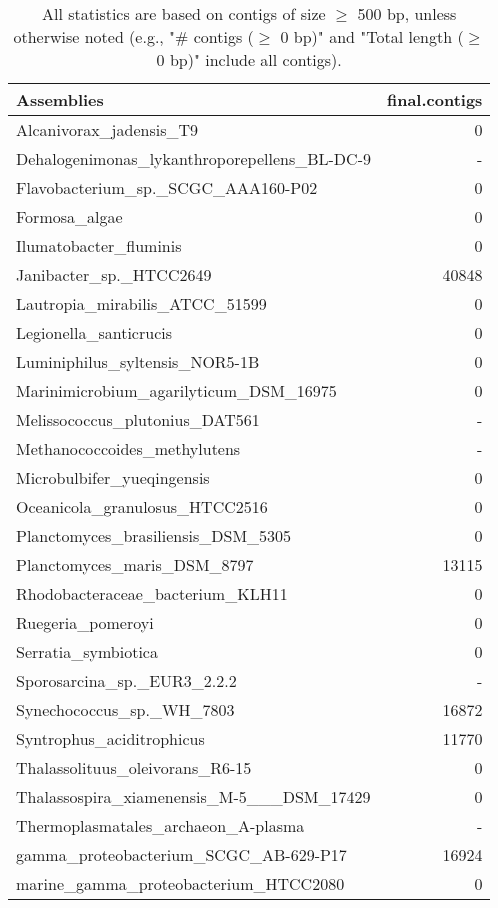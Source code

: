 \documentclass[12pt,a4paper]{article}
\begin{document}
\begin{table}[ht]
\begin{center}
\caption{All statistics are based on contigs of size $\geq$ 500 bp, unless otherwise noted (e.g., "\# contigs ($\geq$ 0 bp)" and "Total length ($\geq$ 0 bp)" include all contigs).}
\begin{tabular}{|l*{1}{|r}|}
\hline
Assemblies & final.contigs \\ \hline
Alcanivorax\_jadensis\_T9 & 0 \\ \hline
Dehalogenimonas\_lykanthroporepellens\_BL-DC-9 & - \\ \hline
Flavobacterium\_sp.\_SCGC\_AAA160-P02 & 0 \\ \hline
Formosa\_algae & 0 \\ \hline
Ilumatobacter\_fluminis & 0 \\ \hline
Janibacter\_sp.\_HTCC2649 & 40848 \\ \hline
Lautropia\_mirabilis\_ATCC\_51599 & 0 \\ \hline
Legionella\_santicrucis & 0 \\ \hline
Luminiphilus\_syltensis\_NOR5-1B & 0 \\ \hline
Marinimicrobium\_agarilyticum\_DSM\_16975 & 0 \\ \hline
Melissococcus\_plutonius\_DAT561 & - \\ \hline
Methanococcoides\_methylutens & - \\ \hline
Microbulbifer\_yueqingensis & 0 \\ \hline
Oceanicola\_granulosus\_HTCC2516 & 0 \\ \hline
Planctomyces\_brasiliensis\_DSM\_5305 & 0 \\ \hline
Planctomyces\_maris\_DSM\_8797 & 13115 \\ \hline
Rhodobacteraceae\_bacterium\_KLH11 & 0 \\ \hline
Ruegeria\_pomeroyi & 0 \\ \hline
Serratia\_symbiotica & 0 \\ \hline
Sporosarcina\_sp.\_EUR3\_2.2.2 & - \\ \hline
Synechococcus\_sp.\_WH\_7803 & 16872 \\ \hline
Syntrophus\_aciditrophicus & 11770 \\ \hline
Thalassolituus\_oleivorans\_R6-15 & 0 \\ \hline
Thalassospira\_xiamenensis\_M-5\_\_\_DSM\_17429 & 0 \\ \hline
Thermoplasmatales\_archaeon\_A-plasma & - \\ \hline
gamma\_proteobacterium\_SCGC\_AB-629-P17 & 16924 \\ \hline
marine\_gamma\_proteobacterium\_HTCC2080 & 0 \\ \hline
\end{tabular}
\end{center}
\end{table}
\end{document}
